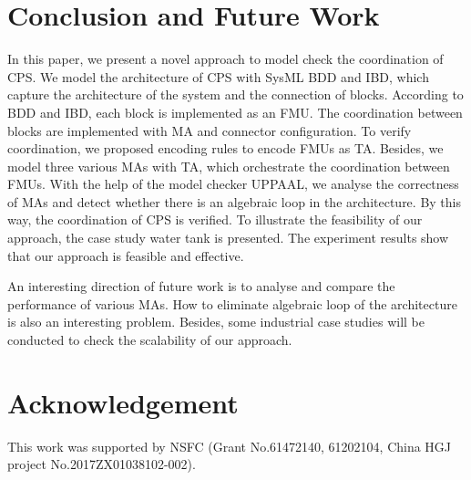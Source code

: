\section{Conclusion and Future Work}
\label{sec:conclusion&ack}
In this paper, we present a novel approach to model check the coordination of CPS.  We model the architecture of CPS with SysML BDD and IBD, which capture the architecture of the system and the connection of blocks. According to BDD and IBD, each block is implemented as an FMU. The coordination between blocks are implemented with MA and connector configuration. To verify coordination, we proposed encoding rules to encode FMUs as TA. Besides, we model three various MAs with TA, which orchestrate the coordination between FMUs. With the help of the model checker UPPAAL, we  analyse the correctness of MAs and detect whether there is an algebraic loop in the architecture. By this way, the coordination of CPS is verified. To illustrate the feasibility of our approach, the case study water tank is presented. The experiment results show that our approach is feasible and effective. 

An interesting direction of future work is to analyse and compare the performance of various MAs. How to eliminate algebraic loop of the architecture is also an interesting problem. Besides, some industrial case studies will be conducted to check the scalability of our approach.
\section*{Acknowledgement}
This work was supported by NSFC (Grant No.61472140, 61202104, China HGJ project No.2017ZX01038102-002). 




